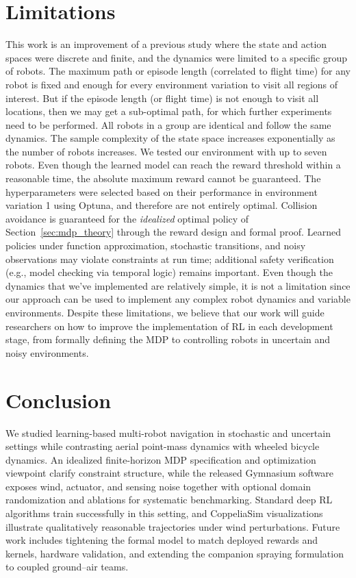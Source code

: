 \documentclass{article}
\begin{document}
\section{Limitations}
\label{sec:limitations}
This work is an improvement of a previous study where the state and action spaces were discrete and finite, and the dynamics were limited to a specific group of robots. The maximum path or episode length (correlated to flight time) for any robot is fixed and enough for every environment variation to visit all regions of interest. But if the episode length (or flight time) is not enough to visit all locations, then we may get a sub-optimal path, for which further experiments need to be performed. All robots in a group are identical and follow the same dynamics. The sample complexity of the state space increases exponentially as the number of robots increases. We tested our environment with up to seven robots. Even though the learned model can reach the reward threshold within a reasonable time, the absolute maximum reward cannot be guaranteed. The hyperparameters were selected based on their performance in environment variation 1 using Optuna, and therefore are not entirely optimal. Collision avoidance is guaranteed for the \emph{idealized} optimal policy of Section~\ref{sec:mdp_theory} through the reward design and formal proof. Learned policies under function approximation, stochastic transitions, and noisy observations may violate constraints at run time; additional safety verification (e.g., model checking via temporal logic) remains important.
Even though the dynamics that we've implemented are relatively simple, it is not a limitation since our approach can be used to implement any complex robot dynamics and variable environments. Despite these limitations, we believe that our work will guide researchers on how to improve the implementation of RL in each development stage, from formally defining the MDP to controlling robots in uncertain and noisy environments.

\section{Conclusion}
\label{sec:conclusion}
We studied learning-based multi-robot navigation in stochastic and uncertain settings while contrasting aerial point-mass dynamics with wheeled bicycle dynamics. An idealized finite-horizon MDP specification and optimization viewpoint clarify constraint structure, while the released Gymnasium software exposes wind, actuator, and sensing noise together with optional domain randomization and ablations for systematic benchmarking. Standard deep RL algorithms train successfully in this setting, and CoppeliaSim visualizations illustrate qualitatively reasonable trajectories under wind perturbations. Future work includes tightening the formal model to match deployed rewards and kernels, hardware validation, and extending the companion spraying formulation to coupled ground--air teams.
\end{document}
